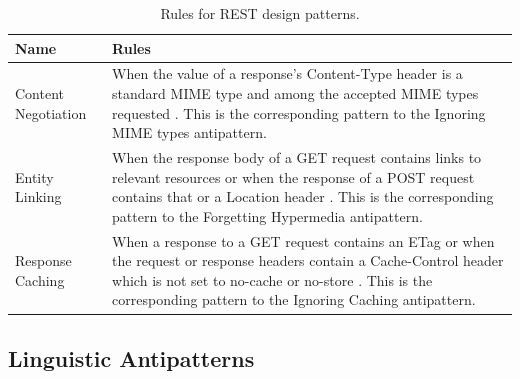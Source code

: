 \begin{center}
\begin{table}[!ht]
\small
\begin{tabular}{|p{5cm}|p{9cm}|}
\hline \textbf{Name} & \textbf{Rules} \\
\hline 
Content Negotiation &
When the value of a response’s Content-Type header is a standard MIME type and among the accepted MIME types requested \cite{design}. This is the corresponding pattern to the Ignoring MIME types antipattern.

\\ \hline
Entity Linking &
When the response body of a GET request contains links to relevant resources or when the response of a POST request contains that or a Location header \cite{design}. This is the corresponding pattern to the Forgetting Hypermedia antipattern. 

\\ \hline
Response Caching &
When a response to a GET request contains an ETag or when the request or response headers contain a Cache-Control header which is not set to no-cache or no-store \cite{design}. This is the corresponding pattern to the  Ignoring Caching antipattern. 

\\ \hline
\end{tabular}
 \caption{Rules for REST design patterns.}
 \label{tab:RulesforRESTdesignpatterns}
\end{table}
\end{center}

\subsection{Linguistic Antipatterns}

